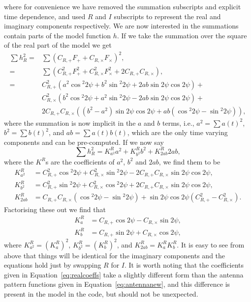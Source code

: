 where for convenience we have removed the summation subscripts and explicit time dependence, and used $R$ and $I$ subscripts to represent the real and imaginary components respectively. We are now interested in the summations contain parts of the model function $h$. If we take the summation over the square of the real part of the model we get
\begin{align}\label{eq:exlikepart}
\sum h_R^2 =& \sum \left(C_{R,+} F_+ + C_{R,\times} F_{\times} \right)^2, \nonumber \\
 = & \sum \left(C_{R,+}^2 F_+^2 + C_{R,\times}^2 F_{\times}^2 + 2C_{R,+}C_{R,\times}\right), \nonumber \\
 = & C_{R,+}^2 \left(a^2 \cos{}^2{2\psi} + b^2 \sin{}^2{2\psi} + 2ab\sin{2\psi}\cos{2\psi}\right) + \nonumber \\
 & C_{R,\times}^2 \left(b^2 \cos{}^2{2\psi} + a^2\sin{}^2{2\psi} - 2ab\sin{2\psi}\cos{2\psi} \right) + \nonumber \\
 & 2C_{R,+}C_{R,\times}\left( (b^2 - a^2)\sin{2\psi}\cos{2\psi} + ab(\cos{}^2{2\psi} - \sin{}^2{2\psi}) \right),
\end{align}
where the summation is now implicit in the $a$ and $b$ terms, i.e., $a^2 = \sum a(t)^2$, $b^2 = \sum b(t)^2$, and $ab = \sum a(t)b(t)$, which are the only time varying components
and can be pre-computed. If we now say
\begin{equation}
\sum h_R^2 = K_{a^2}^Ra^2 + K_{b^2}^Rb^2 + K_{2ab}^R2ab,
\end{equation}
where the $K^R$s are the coefficients of $a^2$, $b^2$ and $2ab$, we find them to be
\begin{align}
K_{a^2}^R & = C_{R,+}^2 \cos{}^2{2\psi} + C_{R,\times}^2\sin{}^2{2\psi} - 2C_{R,+}C_{R,\times}\sin{2\psi}\cos{2\psi}, \nonumber \\
K_{b^2}^R & = C_{R,+}^2 \sin{}^2{2\psi} + C_{R,\times}^2\cos{}^2{2\psi} + 2C_{R,+}C_{R,\times}\sin{2\psi}\cos{2\psi}, \nonumber \\
K_{2ab}^R & = C_{R,+}C_{R,\times}\left(\cos{}^2{2\psi} - \sin{}^2{2\psi} \right) + \sin{2\psi}\cos{2\psi}\left(C_{R,+}^2 - C_{R,\times}^2\right).
\end{align}
Factorising these out we find that
\begin{align}\label{eq:realcoeffs}
K_{a}^R &= C_{R,+}\cos{2\psi} - C_{R,\times}\sin{2\psi}, \nonumber \\
K_{b}^R &= C_{R,+}\sin{2\psi} + C_{R,\times}\cos{2\psi},
\end{align}
where $K_{a^2}^R = \left(K_{a}^R\right)^2$, $K_{b^2}^R = \left(K_{b}^R\right)^2$, and $K_{2ab}^R = K_{a}^RK_{b}^R$.
It is easy to see from above that things will be identical for the imaginary components and the equations hold just
by swapping $R$ for $I$.
It is worth noting that the coefficients given in Equation~\ref{eq:realcoeffs} take a slightly different form than
the antenna pattern functions given in Equation~\ref{eq:antennanew}, and this difference is present in the model
in the \lppen code, but should not be unexpected.

